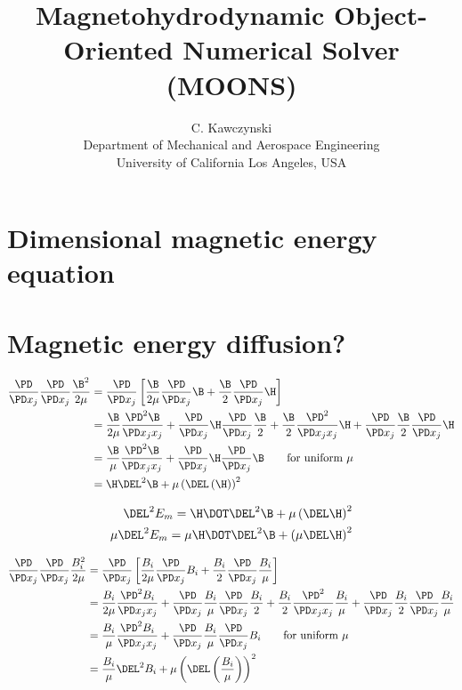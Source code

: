 \documentclass[11pt]{article}
\begin{document}
\doublespacing
\title{Magnetohydrodynamic Object-Oriented Numerical Solver (MOONS)}
\author{C. Kawczynski \\
Department of Mechanical and Aerospace Engineering \\
University of California Los Angeles, USA\\
}
\maketitle

\section{Dimensional magnetic energy equation}

\section{Magnetic energy diffusion?}
\begin{align}
	\frac{\PD}{\PD x_j} \frac{\PD}{\PD x_j} \frac{\B^2}{2 \mu}
	& =
	\frac{\PD}{\PD x_j} 
	\left[
	\frac{\B}{2\mu} \frac{\PD}{\PD x_j} \B +  
	\frac{\B}{2} \frac{\PD}{\PD x_j} \H
	\right] \\
	& =
	\frac{\B}{2\mu} \frac{\PD^2 \B}{\PD x_jx_j} + 
	\frac{\PD}{\PD x_j} \H \frac{\PD}{\PD x_j} \frac{\B}{2} + 
	\frac{\B}{2} \frac{\PD^2 }{\PD x_jx_j} \H + 
	\frac{\PD}{\PD x_j} \frac{\B}{2} \frac{\PD}{\PD x_j} \H \\
	& =
	\frac{\B}{\mu} \frac{\PD^2 \B}{\PD x_jx_j} + 
	\frac{\PD}{\PD x_j} \H \frac{\PD}{\PD x_j} \B \qquad \text{for uniform $\mu$} \\
	& = \H \DEL^2 \B + \mu \left(\DEL \left( \H \right) \right)^2
\end{align}

\begin{equation}\begin{aligned}
	\DEL^2 E_m = \H \DOT \DEL^2 \B + \mu \left( \DEL \H \right)^2 \\
	\mu \DEL^2 E_m = \mu \H \DOT \DEL^2 \B + \left( \mu \DEL \H \right)^2 \\
\end{aligned}\end{equation}

\begin{align}
	\frac{\PD}{\PD x_j} \frac{\PD}{\PD x_j} \frac{B_i^2}{2 \mu}
	& =
	\frac{\PD}{\PD x_j} 
	\left[
	\frac{B_i}{2\mu} \frac{\PD}{\PD x_j} B_i +  
	\frac{B_i}{2} \frac{\PD}{\PD x_j} \frac{B_i}{\mu}
	\right] \\
	& =
	\frac{B_i}{2\mu} \frac{\PD^2 B_i}{\PD x_jx_j} + 
	\frac{\PD}{\PD x_j} \frac{B_i}{\mu} \frac{\PD}{\PD x_j} \frac{B_i}{2} + 
	\frac{B_i}{2} \frac{\PD^2 }{\PD x_jx_j} \frac{B_i}{\mu} + 
	\frac{\PD}{\PD x_j} \frac{B_i}{2} \frac{\PD}{\PD x_j} \frac{B_i}{\mu} \\
	& =
	\frac{B_i}{\mu} \frac{\PD^2 B_i}{\PD x_jx_j} + 
	\frac{\PD}{\PD x_j} \frac{B_i}{\mu} \frac{\PD}{\PD x_j} B_i \qquad \text{for uniform $\mu$} \\
	& = \frac{B_i}{\mu} \DEL^2 B_i + \mu \left(\DEL \left( \frac{B_i}{\mu} \right) \right)^2
\end{align}
\end{document}
